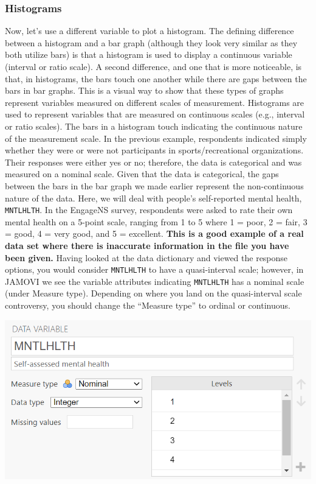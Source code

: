 \documentclass[
]{book}
\begin{document}
\hypertarget{histograms-1}{%
\subsubsection{Histograms}\label{histograms-1}}

Now, let's use a different variable to plot a histogram. The defining difference between a histogram and a bar graph (although they look very similar as they both utilize bars) is that a histogram is used to display a continuous variable (interval or ratio scale). A second difference, and one that is more noticeable, is that, in histograms, the bars touch one another while there are gaps between the bars in bar graphs. This is a visual way to show that these types of graphs represent variables measured on different scales of measurement. Histograms are used to represent variables that are measured on continuous scales (e.g., interval or ratio scales). The bars in a histogram touch indicating the continuous nature of the measurement scale. In the previous example, respondents indicated simply whether they were or were not participants in sports/recreational organizations. Their responses were either yes or no; therefore, the data is categorical and was measured on a nominal scale. Given that the data is categorical, the gaps between the bars in the bar graph we made earlier represent the non-continuous nature of the data.
Here, we will deal with people's self-reported mental health, \texttt{MNTLHLTH}. In the EngageNS survey, respondents were asked to rate their own mental health on a 5-point scale, ranging from 1 to 5 where 1 = poor, 2 = fair, 3 = good, 4 = very good, and 5 = excellent.
\textbf{This is a good example of a real data set where there is inaccurate information in the file you have been given.} Having looked at the data dictionary and viewed the response options, you would consider \texttt{MNTLHLTH} to have a quasi-interval scale; however, in JAMOVI we see the variable attributes indicating \texttt{MNTLHLTH} has a nominal scale (under Measure type). Depending on where you land on the quasi-interval scale controversy, you should change the ``Measure type'' to ordinal or continuous.

\includegraphics{img/MNTLHLTHWrongScale.png}
\end{document}
